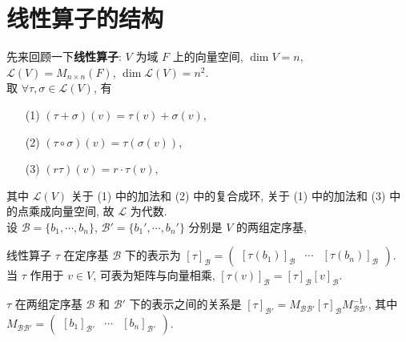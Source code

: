 \documentclass{note}
\begin{document}
\fi
\chapter{线性算子的结构}
先来回顾一下\textbf{线性算子}: $V$ 为域 $F$ 上的向量空间, $\dim V=n$, $\mathcal{L}(V)=M_{n\times n}(F)$, $\dim\mathcal{L}(V)=n^2$.\\
取 $\forall\tau,\sigma\in\mathcal{L}(V)$, 有
\begin{itemize}
    \item[(1)] $(\tau+\sigma)(v)=\tau(v)+\sigma(v)$,
    \item[(2)] $(\tau\circ\sigma)(v)=\tau(\sigma(v))$,
    \item[(3)] $(r\tau)(v)=r\cdot\tau(v)$,
\end{itemize}
其中 $\mathcal{L}(V)$ 关于 (1) 中的加法和 (2) 中的复合成环, 关于 (1) 中的加法和 (3) 中的点乘成向量空间, 故 $\mathcal{L}$ 为代数.\\
设 $\mathcal{B}=\{b_1,\cdots,b_n\}$, $\mathcal{B}'=\{b_1',\cdots,b_n'\}$ 分别是 $V$ 的两组定序基,
\begin{center}
\end{center}

\begin{thm}[(课本定理 7.1)]
    线性算子 $\tau$ 在定序基 $\mathcal{B}$ 下的表示为 $[\tau]_{\mathcal{B}}=\begin{pmatrix}
        [\tau(b_1)]_{\mathcal{B}}&\cdots&[\tau(b_n)]_{\mathcal{B}}
    \end{pmatrix}$.\\
    当 $\tau$ 作用于 $v\in V$, 可表为矩阵与向量相乘, $[\tau(v)]_{\mathcal{B}}=[\tau]_{\mathcal{B}}[v]_{\mathcal{B}}$.
\end{thm}

\begin{thm}[(课本定理 7.2)]
    $\tau$ 在两组定序基 $\mathcal{B}$ 和 $\mathcal{B}'$ 下的表示之间的关系是 $[\tau]_{\mathcal{B}'}=M_{\mathcal{BB}'}[\tau]_{\mathcal{B}}M_{\mathcal{BB}'}^{-1}$, 其中 $M_{\mathcal{BB}'}=\begin{pmatrix}
        [b_1]_{\mathcal{B}'}&\cdots&[b_n]_{\mathcal{B}'}
    \end{pmatrix}$.
\end{thm}
\end{document}
